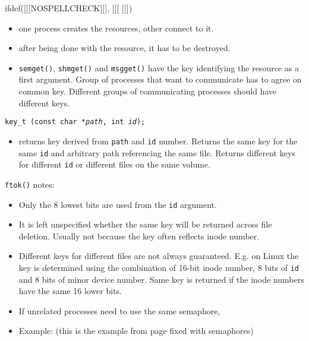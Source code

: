 
ifdef([[[NOSPELLCHECK]]], [[[
]]])

\begin{slide}
\begin{itemize}
\item one process creates the resources, other connect to it.
\item after being done with the resource, it has to be destroyed.
\item \texttt{semget()}, \texttt{shmget()} and
\texttt{msgget()} have the key identifying the resource as a first argument.
Group of processes that want to communicate has to agree on common key.
Different groups of communicating processes should have different keys.
\end{itemize}
\texttt{key\_t (const char *\emph{path}, int \emph{id});}
\begin{itemize}
\item returns key derived from \texttt{path} and \texttt{id} number.
Returns the same key for the same \texttt{id} and arbitrary path referencing the
same file. Returns different keys for different \texttt{id} or different files
on the same volume.
\end{itemize}
\end{slide}

\label{FTOK} \texttt{ftok()} notes:
\begin{itemize}
\item Only the 8 lowest bits are used from the \texttt{id} argument.
\item It is left unspecified whether the same key will be returned across file
deletion. Usually not because the key often reflects inode number.
\item Different keys for different files are not always guaranteed. E.g. on
Linux the key is determined using the combination of 16-bit inode number, 8 bits
of \texttt{id} and 8 bits of minor device number. Same key is returned if the
inode numbers have the same 16 lower bits.
\item If unrelated processes need to use the same semaphore, 
\item \label{SEM_FIXED_RACE_C} Example: 
(this is the  example from page \pageref{RACE_C} fixed
with semaphores)
\end{itemize}

\endinput
